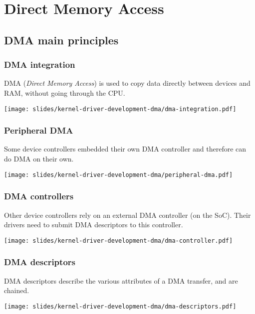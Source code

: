 \section{Direct Memory Access}

\subsection{DMA main principles}

\begin{frame}
  \frametitle{DMA integration}
  DMA ({\em Direct Memory Access}) is used to copy data directly between
  devices and RAM, without going through the CPU.
  \begin{center}
    \texttt{[image: slides/kernel-driver-development-dma/dma-integration.pdf]}
  \end{center}
\end{frame}

\begin{frame}
  \frametitle{Peripheral DMA}
  Some device controllers embedded their own DMA controller
  and therefore can do DMA on their own.
  \begin{center}
    \texttt{[image: slides/kernel-driver-development-dma/peripheral-dma.pdf]}
  \end{center}
\end{frame}

\begin{frame}
  \frametitle{DMA controllers}
  Other device controllers rely on an external DMA controller (on the
  SoC). Their drivers need to submit DMA descriptors to this controller.
  \begin{center}
    \texttt{[image: slides/kernel-driver-development-dma/dma-controller.pdf]}
  \end{center}
\end{frame}

\begin{frame}
  \frametitle{DMA descriptors}
  DMA descriptors describe the various attributes of a DMA transfer, and are chained.
  \begin{center}
    \texttt{[image: slides/kernel-driver-development-dma/dma-descriptors.pdf]}
  \end{center}
\end{frame}

